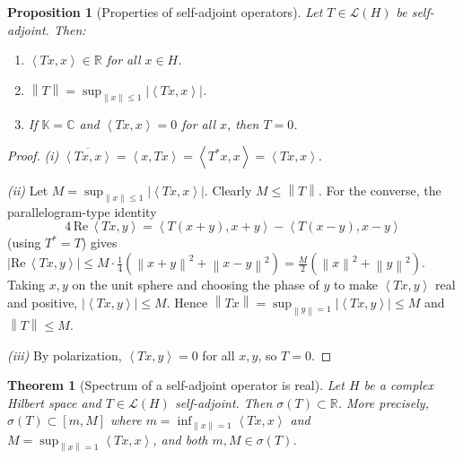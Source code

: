 \documentclass[a4paper,12pt]{book}
\newcommand{\R}{\mathbb{R}}
\newcommand{\C}{\mathbb{C}}
\newcommand{\K}{\mathbb{K}}
\newcommand{\norm}[1]{\left\| #1 \right\|}
\newcommand{\abs}[1]{\left| #1 \right|}
\newcommand{\inner}[2]{\left\langle #1, #2 \right\rangle}
\theoremstyle{definition}
\theoremstyle{plain}
\newtheorem{theorem}[definition]{Theorem}
\newtheorem{proposition}[definition]{Proposition}
\theoremstyle{remark}
\begin{document}
\begin{proposition}[Properties of self-adjoint operators]
\label{prop:self-adjoint-props}
Let $T\in\mathcal{L}(H)$ be self-adjoint. Then:
\begin{enumerate}[label=(\roman*)]
  \item $\inner{Tx}{x}\in\R$ for all $x\in H$.
  \item $\norm{T} = \sup_{\norm{x}\leq 1}\abs{\inner{Tx}{x}}$.
  \item If $\K=\C$ and $\inner{Tx}{x}=0$ for all $x$, then $T=0$.
\end{enumerate}
\end{proposition}

\begin{proof}
\emph{(i)} $\overline{\inner{Tx}{x}} = \inner{x}{Tx} = \inner{T^*x}{x}
= \inner{Tx}{x}$.

\emph{(ii)} Let $M = \sup_{\norm{x}\leq 1}\abs{\inner{Tx}{x}}$. Clearly
$M\leq\norm{T}$. For the converse, the parallelogram-type identity
\[
  4\,\mathrm{Re}\,\inner{Tx}{y}
  = \inner{T(x+y)}{x+y} - \inner{T(x-y)}{x-y}
\]
(using $T^*=T$) gives $\abs{\mathrm{Re}\,\inner{Tx}{y}}\leq M\cdot\frac{1}{4}
(\norm{x+y}^2+\norm{x-y}^2)=\frac{M}{2}(\norm{x}^2+\norm{y}^2)$.
Taking $x,y$ on the unit sphere and choosing the phase of $y$ to make
$\inner{Tx}{y}$ real and positive, $\abs{\inner{Tx}{y}}\leq M$. Hence
$\norm{Tx}=\sup_{\norm{y}=1}\abs{\inner{Tx}{y}}\leq M$ and $\norm{T}\leq M$.

\emph{(iii)} By polarization, $\inner{Tx}{y}=0$ for all $x,y$, so $T=0$.
\end{proof}

\begin{theorem}[Spectrum of a self-adjoint operator is real]
\label{thm:spectrum-selfadj-real}
Let $H$ be a complex Hilbert space and $T\in\mathcal{L}(H)$ self-adjoint. Then
$\sigma(T)\subset\R$. More precisely,
$\sigma(T)\subset[m,M]$ where $m=\inf_{\norm{x}=1}\inner{Tx}{x}$ and
$M=\sup_{\norm{x}=1}\inner{Tx}{x}$, and both $m,M\in\sigma(T)$.
\end{theorem}
\end{document}
